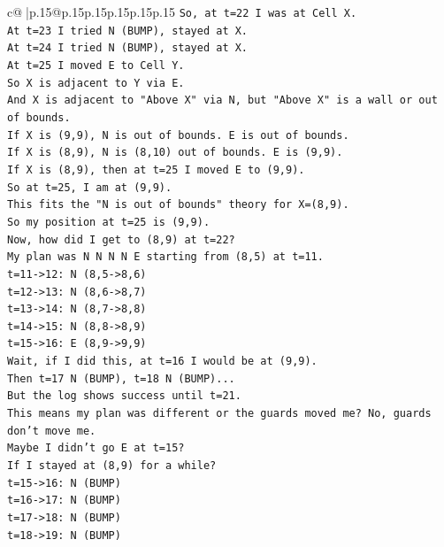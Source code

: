 \documentclass{article}
\begin{document}
{\begin{supertabular}{c@{$\;$}|p{.15\linewidth}@{}p{.15\linewidth}p{.15\linewidth}p{.15\linewidth}p{.15\linewidth}p{.15\linewidth}}
{{{\texttt{So, at t=22 I was at Cell X.} \\
\texttt{At t=23 I tried N (BUMP), stayed at X.} \\
\texttt{At t=24 I tried N (BUMP), stayed at X.} \\
\texttt{At t=25 I moved E to Cell Y.} \\
\texttt{So X is adjacent to Y via E.} \\
\texttt{And X is adjacent to "Above X" via N, but "Above X" is a wall or out of bounds.} \\
\texttt{If X is (9,9), N is out of bounds. E is out of bounds.} \\
\texttt{If X is (8,9), N is (8,10) out of bounds. E is (9,9).} \\
\texttt{If X is (8,9), then at t=25 I moved E to (9,9).} \\
\texttt{So at t=25, I am at (9,9).} \\
\texttt{This fits the "N is out of bounds" theory for X=(8,9).} \\
\texttt{So my position at t=25 is (9,9).} \\
\texttt{Now, how did I get to (8,9) at t=22?} \\
\texttt{My plan was N N N N E starting from (8,5) at t=11.} \\
\texttt{t=11{-}>12: N (8,5{-}>8,6)} \\
\texttt{t=12{-}>13: N (8,6{-}>8,7)} \\
\texttt{t=13{-}>14: N (8,7{-}>8,8)} \\
\texttt{t=14{-}>15: N (8,8{-}>8,9)} \\
\texttt{t=15{-}>16: E (8,9{-}>9,9)} \\
\texttt{Wait, if I did this, at t=16 I would be at (9,9).} \\
\texttt{Then t=17 N (BUMP), t=18 N (BUMP)...} \\
\texttt{But the log shows success until t=21.} \\
\texttt{This means my plan was different or the guards moved me? No, guards don't move me.} \\
\texttt{Maybe I didn't go E at t=15?} \\
\texttt{If I stayed at (8,9) for a while?} \\
\texttt{t=15{-}>16: N (BUMP)} \\
\texttt{t=16{-}>17: N (BUMP)} \\
\texttt{t=17{-}>18: N (BUMP)} \\
\texttt{t=18{-}>19: N (BUMP)} \\
}}}
\end{supertabular}}
\end{document}
